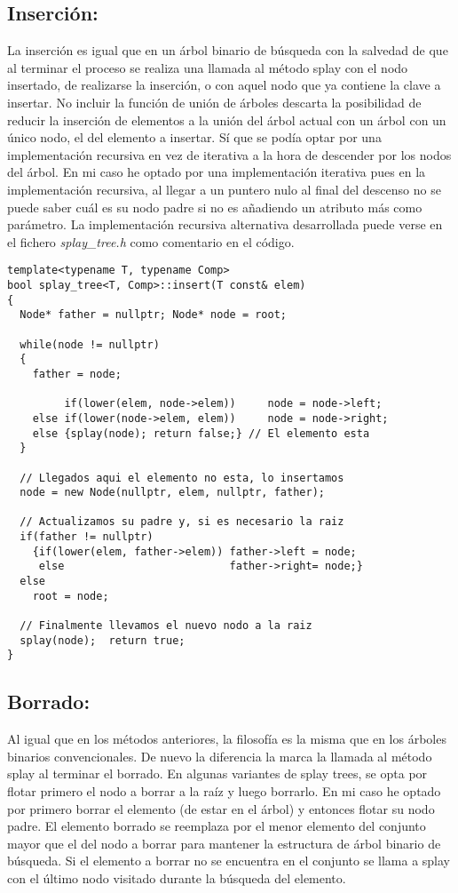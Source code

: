 \documentclass[letterpaper,12pt]{article}
\begin{document}
\subsection{Inserción:}

La inserción es igual que en un árbol binario de búsqueda con la salvedad de 
que al terminar el proceso se realiza una llamada al método splay con el nodo 
insertado, de realizarse la inserción, o con aquel nodo que ya contiene la 
clave a insertar. No incluir la función de unión de árboles descarta la 
posibilidad de reducir la inserción de elementos a la unión del árbol actual
con un árbol con un único nodo, el del elemento a insertar. Sí que se podía
optar por una implementación recursiva en vez de iterativa a la hora de 
descender por los nodos del árbol. En mi caso he optado por una implementación
iterativa pues en la implementación recursiva, al llegar a un puntero nulo al
final del descenso no se puede saber cuál es su nodo padre si no es añadiendo
un atributo más como parámetro. La implementación recursiva alternativa 
desarrollada puede verse en el fichero \textit{splay\_tree.h} como comentario
en el código.

\begin{lstlisting}
template<typename T, typename Comp>
bool splay_tree<T, Comp>::insert(T const& elem)
{
  Node* father = nullptr; Node* node = root;

  while(node != nullptr)
  {
    father = node;

         if(lower(elem, node->elem))     node = node->left;
    else if(lower(node->elem, elem))     node = node->right;
    else {splay(node); return false;} // El elemento esta
  }

  // Llegados aqui el elemento no esta, lo insertamos
  node = new Node(nullptr, elem, nullptr, father);

  // Actualizamos su padre y, si es necesario la raiz
  if(father != nullptr)
    {if(lower(elem, father->elem)) father->left = node;
     else                          father->right= node;}
  else
    root = node;

  // Finalmente llevamos el nuevo nodo a la raiz
  splay(node);  return true;
}
\end{lstlisting}
\subsection{Borrado:}

Al igual que en los métodos anteriores, la filosofía es la misma que en los
árboles binarios convencionales. De nuevo la diferencia la marca la llamada al
método splay al terminar el borrado. En algunas variantes de splay trees, se 
opta por flotar primero el nodo a borrar a la raíz y luego borrarlo. En mi 
caso he optado por primero borrar el elemento (de estar en el árbol) y
entonces flotar su nodo padre. El elemento borrado se reemplaza por el menor 
elemento del conjunto mayor que el del nodo a borrar para mantener la 
estructura de árbol binario de búsqueda. Si el elemento a borrar no se 
encuentra en el conjunto se llama a splay con el último nodo visitado durante 
la búsqueda del elemento.
\end{document}
